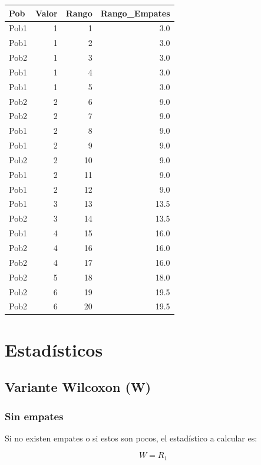 \documentclass[]{book}
\theoremstyle{definition}
\theoremstyle{definition}
\theoremstyle{definition}
\theoremstyle{remark}
\begin{document}
\begin{tabular}{l|r|r|r}
\hline
Pob & Valor & Rango & Rango\_Empates\\
\hline
Pob1 & 1 & 1 & 3.0\\
\hline
Pob1 & 1 & 2 & 3.0\\
\hline
Pob2 & 1 & 3 & 3.0\\
\hline
Pob1 & 1 & 4 & 3.0\\
\hline
Pob1 & 1 & 5 & 3.0\\
\hline
Pob2 & 2 & 6 & 9.0\\
\hline
Pob2 & 2 & 7 & 9.0\\
\hline
Pob1 & 2 & 8 & 9.0\\
\hline
Pob1 & 2 & 9 & 9.0\\
\hline
Pob2 & 2 & 10 & 9.0\\
\hline
Pob1 & 2 & 11 & 9.0\\
\hline
Pob1 & 2 & 12 & 9.0\\
\hline
Pob1 & 3 & 13 & 13.5\\
\hline
Pob2 & 3 & 14 & 13.5\\
\hline
Pob1 & 4 & 15 & 16.0\\
\hline
Pob2 & 4 & 16 & 16.0\\
\hline
Pob2 & 4 & 17 & 16.0\\
\hline
Pob2 & 5 & 18 & 18.0\\
\hline
Pob2 & 6 & 19 & 19.5\\
\hline
Pob2 & 6 & 20 & 19.5\\
\hline
\end{tabular}

\hypertarget{estadisticos}{%
\section{Estadísticos}\label{estadisticos}}

\hypertarget{variante-wilcoxon-w}{%
\subsection{Variante Wilcoxon (W)}\label{variante-wilcoxon-w}}

\hypertarget{sin-empates}{%
\subsubsection{Sin empates}\label{sin-empates}}

Si no existen empates o si estos son pocos, el estadístico a calcular
es:

\[W=R_1\]
\end{document}
